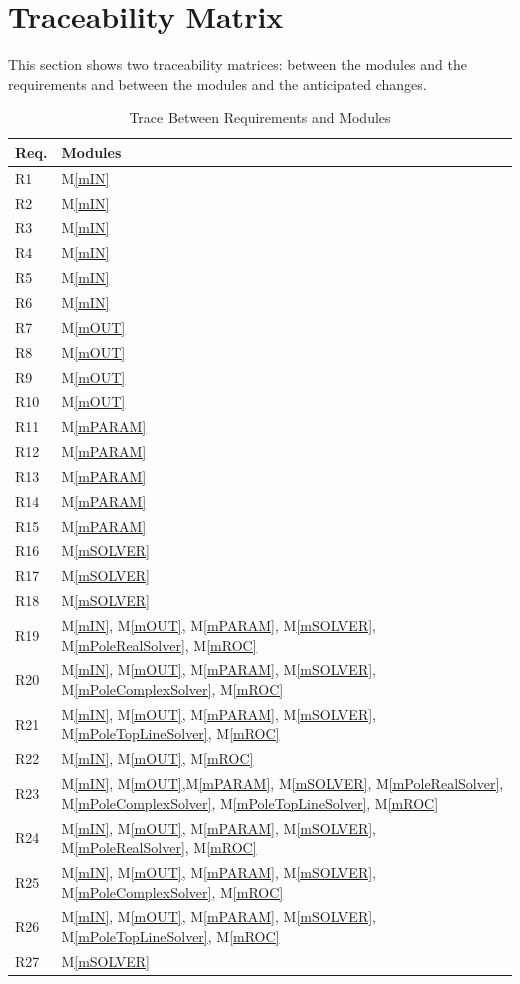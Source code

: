 \documentclass[12pt, titlepage]{article}
\newcommand{\mref}[1]{M\ref{#1}}
\begin{document}
\section{Traceability Matrix} \label{SecTM}

This section shows two traceability matrices: between the modules and the
requirements and between the modules and the anticipated changes.

\begin{table}[H]
\centering
\begin{tabular}{p{} p{}}
\toprule
\textbf{Req.} & \textbf{Modules}\\
\midrule
  R1  & \mref{mIN}\\
  R2  & \mref{mIN}\\
  R3  & \mref{mIN}\\
  R4  & \mref{mIN}\\
  R5  & \mref{mIN}\\
  R6  & \mref{mIN}\\
  R7  & \mref{mOUT}\\
  R8  & \mref{mOUT}\\
  R9  & \mref{mOUT}\\
  R10 & \mref{mOUT}\\
  R11 & \mref{mPARAM}\\
  R12 & \mref{mPARAM}\\
  R13 & \mref{mPARAM}\\
  R14 & \mref{mPARAM}\\
  R15 & \mref{mPARAM}\\
  R16 & \mref{mSOLVER}\\
  R17 & \mref{mSOLVER}\\
  R18 & \mref{mSOLVER}\\
  R19 & \mref{mIN}, \mref{mOUT}, \mref{mPARAM}, \mref{mSOLVER}, \mref{mPoleRealSolver}, \mref{mROC}\\
  R20 & \mref{mIN}, \mref{mOUT}, \mref{mPARAM}, \mref{mSOLVER}, \mref{mPoleComplexSolver}, \mref{mROC}\\
  R21 & \mref{mIN}, \mref{mOUT}, \mref{mPARAM}, \mref{mSOLVER}, \mref{mPoleTopLineSolver}, \mref{mROC}\\
  R22 & \mref{mIN}, \mref{mOUT}, \mref{mROC}\\
  R23 & \mref{mIN}, \mref{mOUT},\mref{mPARAM}, \mref{mSOLVER}, \mref{mPoleRealSolver}, \mref{mPoleComplexSolver}, \mref{mPoleTopLineSolver}, \mref{mROC}\\
  R24 & \mref{mIN}, \mref{mOUT}, \mref{mPARAM}, \mref{mSOLVER}, \mref{mPoleRealSolver}, \mref{mROC}\\
  R25 & \mref{mIN}, \mref{mOUT}, \mref{mPARAM}, \mref{mSOLVER}, \mref{mPoleComplexSolver}, \mref{mROC}\\
  R26 & \mref{mIN}, \mref{mOUT}, \mref{mPARAM}, \mref{mSOLVER}, \mref{mPoleTopLineSolver}, \mref{mROC}\\
  R27 & \mref{mSOLVER}\\
\bottomrule
\end{tabular}
\caption{Trace Between Requirements and Modules}
\label{tb:TblRT}
\end{table}
\end{document}
